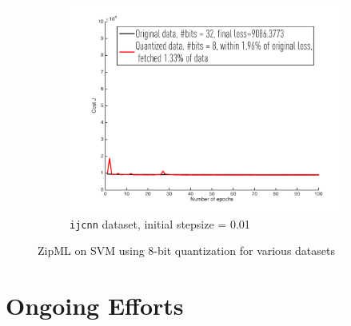\documentclass{article}
\begin{document}
\begin{figure}[h]
\begin{subfigure}[b]{.3\columnwidth}
    \includegraphics[width=\columnwidth]{svm/ijcnn/001}
    \caption{\texttt{ijcnn} dataset, initial stepsize = 0.01}
    \end{subfigure}
\caption{ZipML on SVM using 8-bit quantization for various datasets}
\label{fig:svm}
\end{figure}





\section{Ongoing Efforts}
\end{document}
